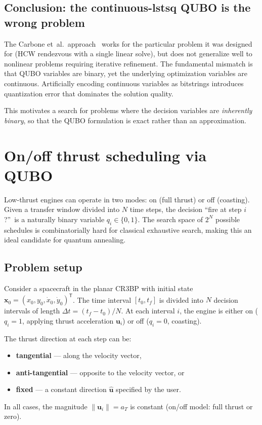 \documentclass[8pt,a4paper]{article}
\newcommand{\bvec}[1]{\bm{#1}}
\newcommand{\xvec}{\bvec{x}}
\newcommand{\uvec}{\bvec{u}}
\newcommand{\TT}{^{\mathsf{T}}}
\theoremstyle{definition}
\theoremstyle{remark}
\begin{document}
\subsection{Conclusion: the continuous-lstsq QUBO is the wrong problem}

The Carbone et~al.\ approach~\cite{Carbone2025} works for the
particular problem it was designed for (HCW rendezvous with a single
linear solve), but does not generalize well to nonlinear problems
requiring iterative refinement.  The fundamental mismatch is that QUBO
variables are binary, yet the underlying optimization variables are
continuous.  Artificially encoding continuous variables as bitstrings
introduces quantization error that dominates the solution quality.

This motivates a search for problems where the decision variables are
\emph{inherently binary}, so that the QUBO formulation is exact rather
than an approximation.


\section{On/off thrust scheduling via QUBO}\label{sec:thrust-scheduling}

Low-thrust engines can operate in two modes: on (full thrust) or off
(coasting).  Given a transfer window divided into $N$ time steps, the
decision ``fire at step $i$?''\ is a naturally binary variable
$q_i \in \{0, 1\}$.  The search space of $2^N$ possible schedules is
combinatorially hard for classical exhaustive search, making this an
ideal candidate for quantum annealing.

\subsection{Problem setup}

Consider a spacecraft in the planar CR3BP with initial state
$\xvec_0 = (x_0, y_0, \dot x_0, \dot y_0)\TT$.
The time interval $[t_0, t_f]$ is divided into $N$ decision intervals
of length $\Delta t = (t_f - t_0)/N$.  At each interval $i$, the
engine is either on ($q_i = 1$, applying thrust acceleration $\uvec_i$)
or off ($q_i = 0$, coasting).

The thrust direction at each step can be:
\begin{itemize}[leftmargin=1.5em, itemsep=1pt]
  \item \textbf{tangential} --- along the velocity vector,
  \item \textbf{anti-tangential} --- opposite to the velocity vector, or
  \item \textbf{fixed} --- a constant direction $\hat{\uvec}$ specified
    by the user.
\end{itemize}
In all cases, the magnitude $\|\uvec_i\| = a_T$ is constant (on/off
model: full thrust or zero).
\end{document}
